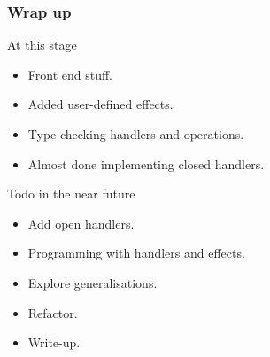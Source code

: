 \begin{frame}
  \frametitle{Wrap up}  
  At this stage
  \begin{itemize}
    \item Front end stuff.
    \item Added user-defined effects.
    \item Type checking handlers and operations.
    \item Almost done implementing closed handlers.
  \end{itemize}
  Todo in the near future
  \begin{itemize}
    \item Add open handlers.
    \item Programming with handlers and effects.
    \item Explore generalisations.
    \item Refactor.
    \item Write-up.
  \end{itemize}
\end{frame}